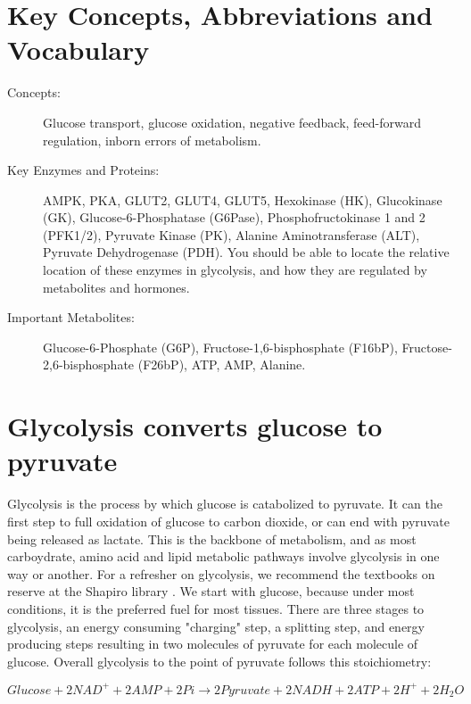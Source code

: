 \documentclass{tufte-handout}
\begin{document}
\section{Key Concepts, Abbreviations and Vocabulary}

\begin{description}
	\item[Concepts:] Glucose transport, glucose oxidation, negative feedback, feed-forward regulation, inborn errors of metabolism.  
	\item[Key Enzymes and Proteins:] AMPK, PKA, GLUT2, GLUT4, GLUT5, Hexokinase (HK), Glucokinase (GK), Glucose-6-Phosphatase (G6Pase), Phosphofructokinase 1 and 2 (PFK1/2), Pyruvate Kinase (PK), Alanine Aminotransferase (ALT), Pyruvate Dehydrogenase (PDH).  You should be able to locate the relative location of these enzymes in glycolysis, and how they are regulated by metabolites and hormones.
	\item[Important Metabolites:] Glucose-6-Phosphate (G6P), Fructose-1,6-bisphosphate (F16bP), Fructose-2,6-bisphosphate (F26bP), ATP, AMP, Alanine.

\end{description}

\pagebreak

\section{Glycolysis converts glucose to pyruvate}

Glycolysis is the process by which glucose is catabolized to pyruvate.  It can the first step to full oxidation of glucose to carbon dioxide, or can end with pyruvate being released as lactate.  This is the backbone of metabolism, and as most carboydrate, amino acid and lipid metabolic pathways involve glycolysis in one way or another.  For a refresher on glycolysis, we recommend the textbooks on reserve at the Shapiro library \citep{Berg2013,Ferrier2017}.  We start with glucose, because under most conditions, it is the preferred fuel for most tissues.  There are three stages to glycolysis, an energy consuming "charging" step, a splitting step, and energy producing steps resulting in two molecules of pyruvate for each molecule of glucose.  Overall glycolysis to the point of pyruvate follows this stoichiometry:

\begin{equation}\label{eq:overall}
Glucose + 2NAD^+ + 2AMP + 2Pi \rightarrow 2Pyruvate + 2NADH + 2ATP + 2H^+ +2H_2O
\end{equation}
\end{document}
